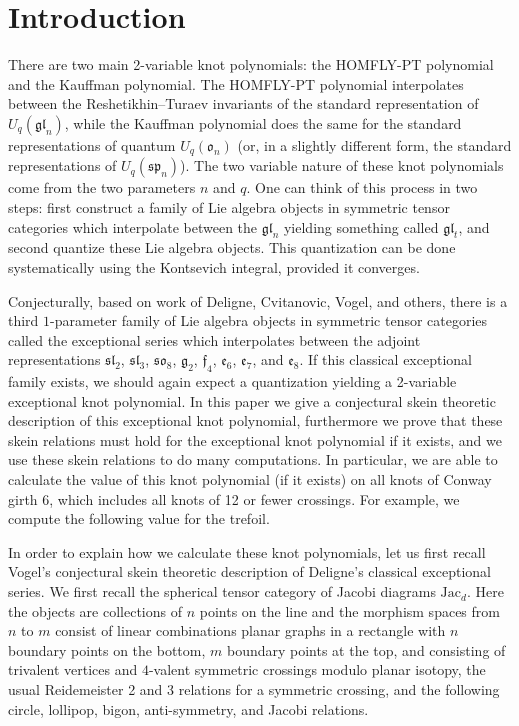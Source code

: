 \documentclass[12pt]{amsart}
\begin{document}
\section{Introduction}
\label{sec:introduction}

There are two main 2-variable knot polynomials: the HOMFLY-PT polynomial and the Kauffman polynomial.  The HOMFLY-PT polynomial interpolates between the Reshetikhin--Turaev invariants of the standard representation of $U_q(\mathfrak{gl}_n)$, while the Kauffman polynomial does the same for the standard representations of quantum $U_q(\mathfrak{o}_n)$ (or, in a slightly different form, the standard representations of $U_q(\mathfrak{sp}_n)$).  The two variable nature of these knot polynomials come from the two parameters $n$ and $q$.  One can think of this process in two steps: first construct a family of Lie algebra objects in symmetric tensor categories which interpolate between the $\mathfrak{gl}_n$ yielding something called $\mathfrak{gl}_t$, and second quantize these Lie algebra objects.   This quantization can be done systematically using the Kontsevich integral, provided it converges.

Conjecturally, based on work of Deligne, Cvitanovic, Vogel, and others, there is a third $1$-parameter family of Lie algebra objects in symmetric tensor categories called the exceptional series which interpolates between the adjoint representations $\mathfrak{sl}_2$, $\mathfrak{sl}_3$, $\mathfrak{so}_8$, $\mathfrak{g}_2$, $\mathfrak{f}_4$, $\mathfrak{e}_6$, $\mathfrak{e}_7$, and $\mathfrak{e}_8$.  If this classical exceptional family exists, we should again expect a quantization yielding a 2-variable exceptional knot polynomial.  In this paper we give a conjectural skein theoretic description of this exceptional knot polynomial, furthermore we prove that these skein relations must hold for the exceptional knot polynomial if it exists, and we use these skein relations to do many computations.  In particular, we are able to calculate the value of this knot polynomial (if it exists) on all knots of Conway girth 6, which includes all knots of 12 or fewer crossings.  For example, we compute the following value for the trefoil.


In order to explain how we calculate these knot polynomials, let us first recall Vogel's conjectural skein theoretic description of Deligne's classical exceptional series.  We first recall the spherical tensor category of Jacobi diagrams $\mathrm{Jac}_d$.  Here the objects are collections of $n$ points on the line and the morphism spaces from $n$ to $m$ consist of linear combinations planar graphs in a rectangle with $n$ boundary points on the bottom, $m$ boundary points at the top, and consisting of trivalent vertices and $4$-valent symmetric crossings modulo planar isotopy, the usual Reidemeister 2 and 3 relations for a symmetric crossing, and the following circle, lollipop, bigon, anti-symmetry, and Jacobi relations.
\end{document}
